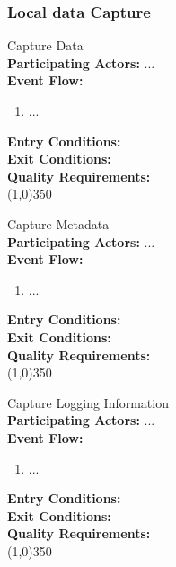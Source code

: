 \subsubsection{Local data Capture}		 
		Capture Data\\	 
		\textbf{Participating Actors:}  ... \\
		\textbf{Event Flow:}
		\begin{enumerate}
\item  ...
	    \end{enumerate}
		\textbf{Entry Conditions:}\\
		\textbf{Exit Conditions:}\\
		\textbf{Quality Requirements:}\\
		\line(1,0){350}	
		
		Capture Metadata\\	 
		\textbf{Participating Actors:}  ... \\
		\textbf{Event Flow:}
		\begin{enumerate}
\item  ...
	    \end{enumerate}
		\textbf{Entry Conditions:}\\
		\textbf{Exit Conditions:}\\
		\textbf{Quality Requirements:}\\
		\line(1,0){350}	
		
		Capture Logging Information\\	 
		\textbf{Participating Actors:}  ... \\
		\textbf{Event Flow:}
		\begin{enumerate}
\item  ...
	    \end{enumerate}
		\textbf{Entry Conditions:}\\
		\textbf{Exit Conditions:}\\
		\textbf{Quality Requirements:}\\
		\line(1,0){350}					